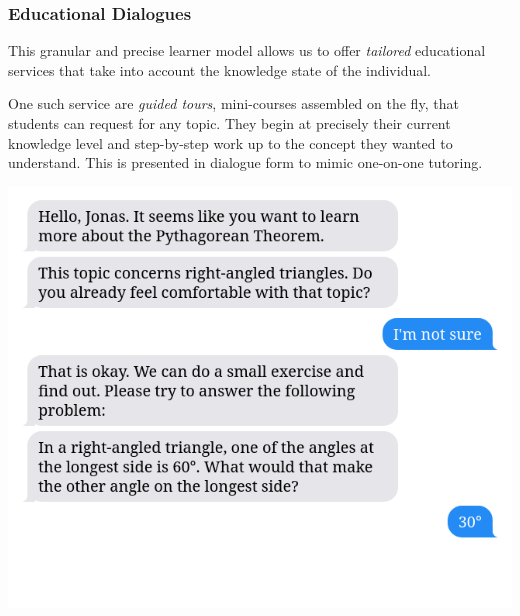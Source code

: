 \documentclass[aspectratio=169, usenames, dvipsnames]{beamer}
\begin{document}
\begin{frame}
\frametitle{Educational Dialogues}
\begin{minipage}{0.45\textwidth}
This granular and precise learner model allows us to offer \emph{tailored}
educational services that take into account the knowledge state of the individual.
\bigskip

One such service are \emph{guided tours}, mini-courses assembled on the fly, that students can request for any topic. They begin at precisely their current knowledge level and step-by-step work up to the concept they wanted to understand. This is presented in dialogue form to mimic one-on-one tutoring.
\end{minipage}%
\hfill
\begin{minipage}{0.5\textwidth}
\includegraphics[height=0.75\textheight,keepaspectratio]{images/bubbles_example_step4} 
\end{minipage}%
\end{frame}
\end{document}
